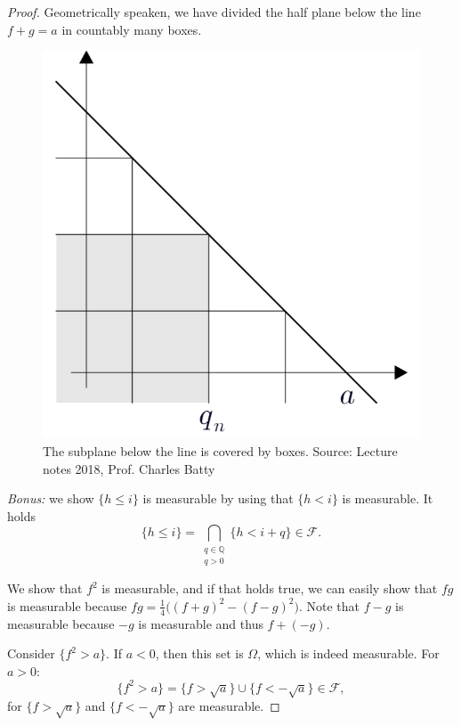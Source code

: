 \documentclass[a4paper, 11pt]{article}
\theoremstyle{plain}
\theoremstyle{definition}
\begin{document}
\begin{itemize}
\begin{proof}[Proof]
		Geometrically speaken, we have divided the half plane below the line $f+g = a$ in countably many boxes.
		\begin{figure}
		\begin{center}
			\includegraphics[scale=0.25]{boxes.png}
			\caption{The subplane below the line is covered by boxes. Source: Lecture notes 2018, Prof. Charles Batty}
		\end{center} 
		\end{figure}
		
		\textit{Bonus:} we show $\{ h \leq i \}$ is measurable by using that $\{ h < i\}$ is measurable. It holds
		\[
			\{ h \leq i \} = \bigcap_{\substack{q \in \mathbb Q\\q > 0}} \{ h < i +q \} \in \mathcal F.
		\]
		
		We show that $f^2$ is measurable, and if that holds true, we can easily show that $fg$ is measurable because $fg = \frac{1}{4}\Big((f+g)^2-(f-g)^2\Big)$. Note that $f-g$ is measurable because $-g$ is measurable and thus $f+(-g)$.
		
		Consider $\{ f^2 > a \}$. If $a < 0$, then this set is $\Omega$, which is indeed measurable. For $a > 0$:
		\[
			\{ f^2 > a \} = \{ f > \sqrt a \} \cup \{ f < -\sqrt a \} \in \mathcal F,
		\]
		for $ \{ f > \sqrt a \}$ and $ \{ f < -\sqrt a \}$ are measurable.
	\end{proof}


\end{itemize}
\end{document}
